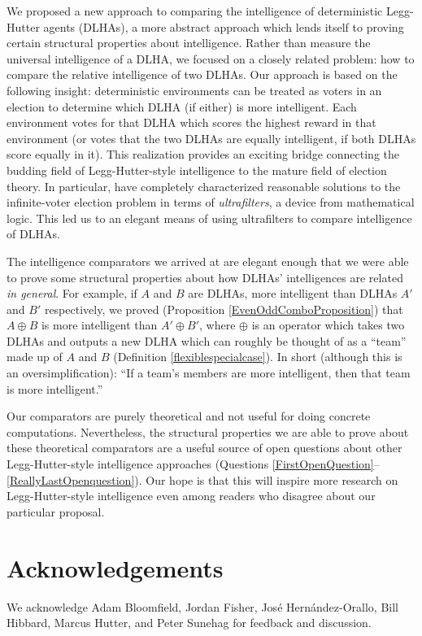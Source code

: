 \documentclass[twoside,11pt]{article}
\begin{document}
We proposed a new approach to comparing the intelligence of
deterministic Legg-Hutter agents (DLHAs), a more
abstract approach which lends itself to proving certain structural properties
about intelligence. Rather than measure the universal intelligence of a
DLHA, we focused on a closely related problem: how to compare the relative
intelligence of two DLHAs. Our approach is based on the following
insight: deterministic environments can be treated as voters in an election to determine
which DLHA (if either) is more intelligent. Each environment votes for that
DLHA which scores the highest reward in that environment (or votes that the
two DLHAs are equally intelligent, if both DLHAs score equally in it).
This realization provides an exciting bridge connecting the budding field of
Legg-Hutter-style intelligence to
the mature field of election theory.
In particular,
\citet{kirman} have completely characterized
reasonable solutions to the infinite-voter election problem in terms of \emph{ultrafilters},
a device from mathematical logic. This led us to an elegant means
of using ultrafilters to compare intelligence of DLHAs.

The intelligence comparators we arrived at are elegant enough that
we were able to prove some structural properties about how DLHAs'
intelligences are related \emph{in general}. For example, if $A$ and $B$ are
DLHAs, more intelligent than DLHAs $A'$ and $B'$ respectively, we proved
(Proposition \ref{EvenOddComboProposition}) that
$A\oplus B$ is more intelligent than $A'\oplus B'$, where $\oplus$ is an
operator which takes two DLHAs and outputs a new DLHA which can roughly
be thought of as a ``team'' made up of $A$ and $B$
(Definition \ref{flexiblespecialcase}).
In short (although this is an oversimplification):
``If a team's members are more intelligent, then that team is more intelligent.''

Our comparators are purely theoretical and not useful
for doing concrete computations. Nevertheless, the structural
properties we are able to prove about these theoretical comparators
are a useful source of open questions about other Legg-Hutter-style
intelligence approaches (Questions \ref{FirstOpenQuestion}--\ref{ReallyLastOpenquestion}).
Our hope is that this will inspire more research on Legg-Hutter-style intelligence
even among readers who disagree about our particular proposal.

\section*{Acknowledgements}


We acknowledge Adam Bloomfield, Jordan Fisher,
Jos{\'e} Hern{\'a}ndez-Orallo,
Bill Hibbard, Marcus Hutter, and Peter Sunehag for feedback and discussion.



\end{document}
